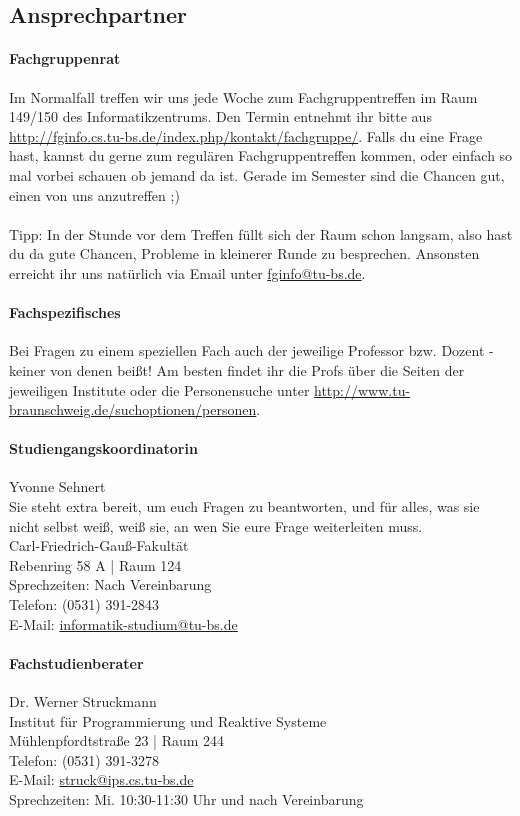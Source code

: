 \subsection{Ansprechpartner}
	\paragraph{Fachgruppenrat}
		Im Normalfall treffen wir uns jede Woche zum
		Fachgruppentreffen im Raum 149/150 des
		Informatikzentrums. Den  Termin entnehmt ihr bitte aus
		\url{http://fginfo.cs.tu-bs.de/index.php/kontakt/fachgruppe/}.
		Falls du eine Frage hast, kannst du gerne zum regulären
		Fachgruppentreffen kommen, oder einfach so mal vorbei
		schauen ob jemand da ist. Gerade im Semester sind die
		Chancen gut, einen von uns anzutreffen ;) \\\\
		Tipp: In der Stunde vor dem
		Treffen füllt sich der Raum schon langsam, also hast du
		da gute Chancen, Probleme in kleinerer Runde zu
		besprechen.
		Ansonsten erreicht ihr uns natürlich via
		Email unter \url{fginfo@tu-bs.de}. 

	\paragraph{Fachspezifisches}
		Bei Fragen zu einem speziellen Fach auch der jeweilige Professor bzw. Dozent - keiner von denen beißt! Am besten findet ihr die Profs über die Seiten der jeweiligen Institute oder die Personensuche unter \url{http://www.tu-braunschweig.de/suchoptionen/personen}.

	\paragraph{Studiengangskoordinatorin}
		Yvonne Sehnert \\
		Sie steht extra bereit, um euch Fragen zu beantworten, und für alles, was sie nicht selbst weiß, weiß sie, an wen Sie eure Frage weiterleiten muss.\\
		Carl-Friedrich-Gauß-Fakultät\\
		Rebenring 58 A | Raum 124\\
		Sprechzeiten: Nach  Vereinbarung\\
		Telefon: (0531) 391-2843\\
		E-Mail: \url{informatik-studium@tu-bs.de}

	\paragraph{Fachstudienberater}
		Dr. Werner Struckmann\\
		Institut für Programmierung und Reaktive Systeme\\
		Mühlenpfordtstraße 23 | Raum 244\\
		Telefon: (0531) 391-3278\\
		E-Mail: \url{struck@ips.cs.tu-bs.de}\\
		Sprechzeiten: Mi. 10:30-11:30 Uhr und nach  Vereinbarung

